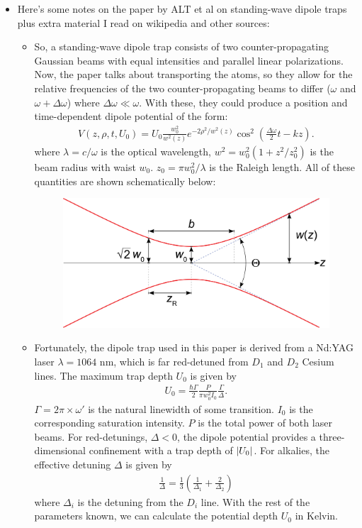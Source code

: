 \documentclass{report}
\theoremstyle{definition}
\newcommand{\f}[2]{\frac{#1}{#2}}
\newcommand{\lp}{\left(}
\newcommand{\rp}{\right)}
\begin{document}
\begin{itemize}
	\item Here's some notes on the paper by ALT et al on standing-wave dipole traps plus extra material I read on wikipedia and other sources:
	\begin{itemize}
		\item So, a standing-wave dipole trap consists of two counter-propagating Gaussian beams with equal intensities and parallel linear polarizations. Now, the paper talks about transporting the atoms, so they allow for the relative frequencies of the two counter-propagating beams to differ ($\omega$ and $\omega + \Delta \omega$) where $\Delta \omega \ll \omega$. With these, they could produce a position and time-dependent dipole potential of the form:
		\begin{align}
		V(z,\rho,t,U_0) = U_0 \f{w_0^2}{w^2(z)}e^{-2\rho^2/w^2(z)}\cos^2\lp \f{\Delta \omega}{2}t - kz \rp.
		\end{align}
		where $\lambda = c/\omega$ is the optical wavelength, $w^2 = w_0^2(1 + z^2/z_0^2)$ is the beam radius with waist $w_0$. $z_0 = \pi w_0^2 / \lambda$ is the Raleigh length. All of these quantities are shown schematically below:
		\begin{figure}[!htb]
			\centering
			\includegraphics[scale=0.05]{gauss.png}
		\end{figure}
	
		\item Fortunately, the dipole trap used in this paper is derived from a Nd:YAG laser $\lambda = 1064$ nm, which is far red-detuned from $D_1$ and $D_2$ Cesium lines. The maximum trap depth $U_0$ is given by
		\begin{align}
		U_0 = \f{\hbar \Gamma}{2}\f{P}{\pi w_0^2 I_0}\f{\Gamma}{\Delta}.
		\end{align}
		$\Gamma = 2\pi \times \omega'$ is the natural linewidth of some transition. $I_0$ is the corresponding saturation intensity. $P$ is the total power of both laser beams. For red-detunings, $\Delta < 0$, the dipole potential provides a three-dimensional confinement with a trap depth of $\abs{U_0}$. For alkalies, the effective detuning $\Delta$ is given by
		\begin{align}
		\f{1}{\Delta} = \f{1}{3}\lp \f{1}{\Delta_1} + \f{2}{\Delta_2} \rp
		\end{align}
		where $\Delta_i$ is the detuning from the $D_i$ line. With the rest of the parameters known, we can calculate the potential depth $U_0$ in Kelvin.
		 

\end{itemize}
\end{itemize}
\end{document}
